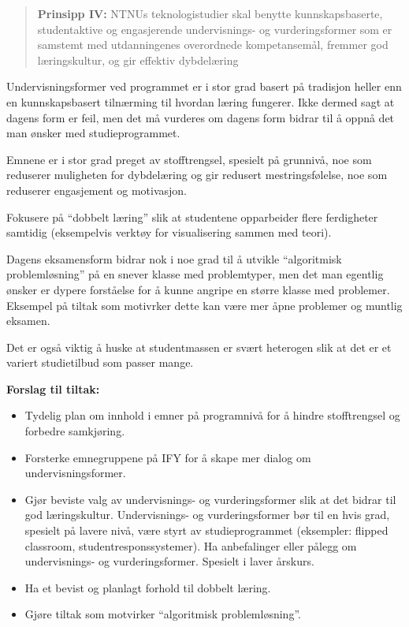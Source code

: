 \begin{quote}
	\textbf{Prinsipp IV:} NTNUs teknologistudier skal benytte kunnskapsbaserte, studentaktive og engasjerende undervisnings- og vurderingsformer som er samstemt med utdanningenes overordnede kompetansemål, fremmer god læringskultur, og gir effektiv dybdelæring
\end{quote}

Undervisningsformer ved programmet er i stor grad basert på tradisjon heller enn en kunnskapsbasert tilnærming til hvordan læring fungerer. Ikke dermed sagt at dagens form er feil, men det må vurderes om dagens form bidrar til å oppnå det man ønsker med studieprogrammet.

Emnene er i stor grad preget av stofftrengsel, spesielt på grunnivå, noe som reduserer muligheten for dybdelæring og gir redusert mestringsfølelse, noe som reduserer engasjement og motivasjon.

Fokusere på \enquote{dobbelt læring} slik at studentene opparbeider flere ferdigheter samtidig (eksempelvis verktøy for visualisering sammen med teori).

Dagens eksamensform bidrar nok i noe grad til å utvikle \enquote{algoritmisk problemløsning} på en snever klasse med problemtyper, men det man egentlig ønsker er dypere forståelse for å kunne angripe en større klasse med problemer. Eksempel på tiltak som motivrker dette kan være mer åpne problemer og muntlig eksamen.

Det er også viktig å huske at studentmassen er svært heterogen slik at det er et variert studietilbud som passer mange. 

\textbf{Forslag til tiltak:}

\begin{itemize}
	\item Tydelig plan om innhold i emner på programnivå for å hindre stofftrengsel og forbedre samkjøring.
	\item Forsterke emnegruppene på IFY for å skape mer dialog om undervisningsformer.
	\item Gjør beviste valg av undervisnings- og vurderingsformer slik at det bidrar til god læringskultur. Undervisnings- og vurderingsformer bør til en hvis grad, spesielt på lavere nivå, være styrt av studieprogrammet (eksempler: flipped classroom, studentresponssystemer). Ha anbefalinger eller pålegg om undervisnings- og vurderingsformer. Spesielt i laver årskurs.
	\item Ha et bevist og planlagt forhold til dobbelt læring.
	\item Gjøre tiltak som motvirker \enquote{algoritmisk problemløsning}.
\end{itemize}

